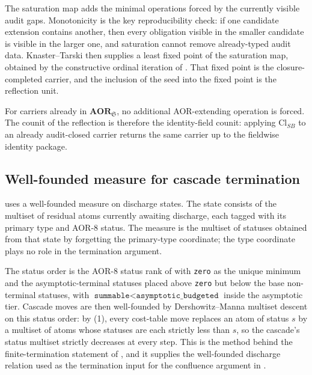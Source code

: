 \documentclass[11pt]{article}
\newcommand{\AOR}{\mathbf{AOR}}
\newcommand{\ClSB}{\mathrm{Cl}_{SB}}
\theoremstyle{definition}
\begin{document}
The saturation map adds the minimal operations forced by the currently
visible audit gaps.  Monotonicity is the key reproducibility check: if
one candidate extension contains another, then every obligation visible
in the smaller candidate is visible in the larger one, and saturation
cannot remove already-typed audit data.  Knaster--Tarski
\citep{TarskiFixedPoint1955} then supplies a least fixed point of the
saturation map, obtained by the constructive ordinal iteration of
\citet{CousotCousotConstructive1979}.  That fixed point is the
closure-completed carrier, and the inclusion of the seed into the
fixed point is the reflection unit.

For carriers already in \(\AOR_{\mathfrak S}\), no additional
AOR-extending operation is forced.  The counit of the reflection is
therefore the identity-field counit: applying \(\ClSB\) to an already
audit-closed carrier returns the same carrier up to the fieldwise
identity package.

\subsection{Well-founded measure for cascade termination}
\label{subsec:aor-methods-cascade-measure}

 uses a well-founded measure on
discharge states.  The state consists of the multiset of residual atoms
currently awaiting discharge, each tagged with its primary type and
AOR-8 status.  The measure is the multiset of statuses obtained from
that state by forgetting the primary-type coordinate; the type
coordinate plays no role in the termination argument.

The status order is the AOR-8 status rank of
 with \texttt{zero} as the unique minimum
and the asymptotic-terminal statuses placed above \texttt{zero} but
below the base non-terminal statuses, with \(\texttt{summable} <
\texttt{asymptotic\_budgeted}\) inside the asymptotic tier.  Cascade
moves are then well-founded by Dershowitz--Manna multiset descent
\citep{DershowitzManna1979Multiset} on this status order: by
(1), every cost-table move
replaces an atom of status \(s\) by a multiset of atoms whose statuses
are each strictly less than \(s\), so the cascade's status multiset
strictly decreases at every step.  This is the method behind the
finite-termination statement of ,
and it supplies the well-founded discharge relation used as the
termination input for the confluence argument in
.
\end{document}
